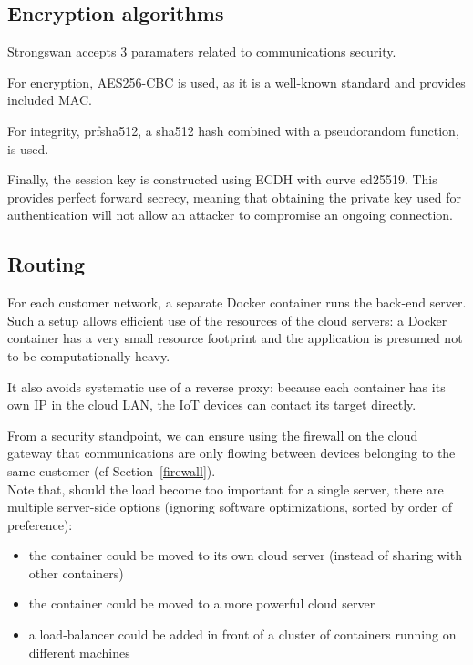 \documentclass[paper=a4, fontsize=11pt]{scrartcl}
\begin{document}
\subsection{Encryption algorithms}

Strongswan accepts 3 paramaters related to communications security.

For encryption, AES256-CBC is used, as it is a well-known standard and provides
included MAC\@.

For integrity, prfsha512, a sha512 hash combined with a pseudorandom
function, is used.

Finally, the session key is constructed using ECDH with curve ed25519.
This provides perfect forward secrecy, meaning that obtaining the private key
used for authentication will not allow an attacker to compromise an ongoing
connection.


\subsection{Routing}

For each customer network, a separate Docker container runs the back-end server.
Such a setup allows efficient use of the resources of the cloud servers: a
Docker container has a very small resource footprint and the application is
presumed not to be computationally heavy.

It also avoids systematic use of a reverse proxy: because each container has its
own IP in the cloud LAN, the IoT devices can contact its target directly.

From a security standpoint, we can ensure using the firewall on the cloud
gateway that communications are only flowing between devices belonging to
the same customer (cf Section~\ref{firewall}).
\\

Note that, should the load become too important for a single server, there are
multiple server-side options (ignoring software optimizations, sorted by order of
preference):
\begin{itemize}
    \item the container could be moved to its own cloud server (instead of
    sharing with other containers)
    \item the container could be moved to a more powerful cloud server
    \item a load-balancer could be added in front of a cluster of containers
        running on different machines
\end{itemize}
\end{document}

